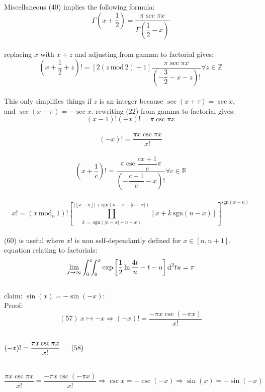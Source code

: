 \documentclass[12pt]{article}
\begin{document}
\pagebreak\begin{section}{Miscellaneous}
	(40) implies the following formula:
	\begin{equation}
		\Gamma\left(x+\dfrac12\right)=\dfrac{\pi\sec\pi x}{\Gamma\left(\dfrac12-x\right)}
	\end{equation}\\
	replacing $x$ with $x+z$ and adjusting from gamma to factorial gives:\\
	\begin{equation}
		\left(x+\frac12+z\right)!=\left[2\left(z\,\text{mod}\,2\right)-1\right]\dfrac{\pi\sec\pi x}{\left(-\dfrac32-x-z\right)!}\forall z\in\mathbb Z
	\end{equation}\\
	This only simplifies things if $z$ is an integer because $\sec(x+\tau)=\sec x$,\\
	and $\sec(x+\pi)=-\sec x$. rewriting (22) from gamma to factorial gives:
	\begin{equation}
		(x-1)!(-x)!=\pi\csc\pi x
	\end{equation}\\
	\begin{equation}
		(-x)!=\dfrac{\pi x\csc\pi x}{x!}
	\end{equation}\\
	\begin{equation}
		\left(x+\dfrac1c\right)!=\dfrac{\pi\csc\dfrac{cx+1}c\pi}{\left(-\dfrac{c+1}c-x\right)!}\forall c\in\mathbb R
	\end{equation}\\
	\begin{equation}
		x!=\left(x\,\text{mod}_n\,1\right)!\left[\prod_{k\,=\,\text{sgn}(\left|n-x\right|+n-x)}^{\left|\left\lfloor x-n\right\rfloor\right|+\text{sgn}\left(n-x-\left|n-x\right|\right)}\left[x+k\,\text{sgn}\left(n-x\right)\right]\right]^{\text{sgn}\left(x-n\right)}
	\end{equation}\\
	(60) is useful where $x!$ is non self-dependantly defined for $x\in[n,n+1]$.\\
	equation relating to factorials:
	\begin{equation}
		\lim_{x\to\infty}\int_0^x\hspace{-0.5em}\int_0^x\exp\left[\dfrac12\ln\dfrac{4t}u-t-u\right]\text d^2tu=\pi
	\end{equation}
	\pagebreak\\
	claim: $\sin(x)=-\sin(-x)$:\\
	Proof:\\
	\begin{equation}
		(57)~x\mapsto-x\Longrightarrow(-x)!=\dfrac{-\pi x\csc(-\pi x)}{x!}
	\end{equation}\\
	\centerline{$(-x)!=\dfrac{\pi x\csc\pi x}{x!}\hspace{1.6em}(58)$}\\
	\begin{equation}
		\dfrac{\pi x\csc\pi x}{x!}=\dfrac{-\pi x\csc(-\pi x)}{x!}\Longrightarrow\csc x=-\csc(-x)\Longrightarrow\sin(x)=-\sin(-x)
	\end{equation}\\
	\blacksquare\\


\end{section}
\end{document}
